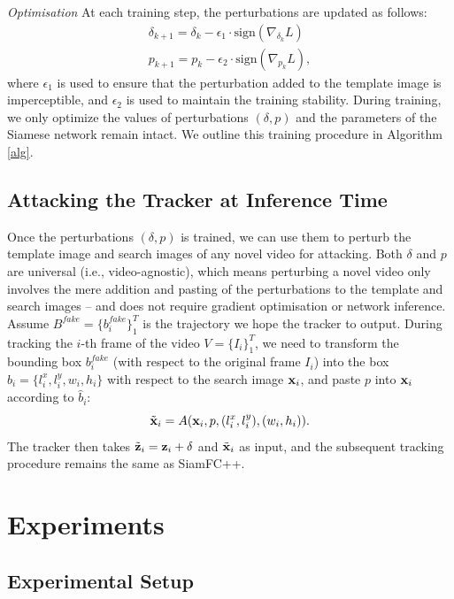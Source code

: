 \documentclass[journal]{IEEEtran}
\begin{document}
\textit{Optimisation} At each training step, the perturbations are updated as follows:
\begin{gather}
\delta_{k+1} = \delta_{k} - \epsilon_1 \cdot \text{sign}(\nabla_{\delta_k}L)\\
p_{k+1} = p_{k} - \epsilon_2 \cdot \text{sign}(\nabla_{p_k}L),
\end{gather}
where $\epsilon_1$ is used to ensure that the perturbation added to the template image is imperceptible, and $\epsilon_2$ is used to maintain the training stability.
During training, we only optimize the values of perturbations $(\delta, p)$ and the parameters of the Siamese network remain intact. We outline this training procedure in Algorithm \ref{alg}.

\subsection{Attacking the Tracker at Inference Time}

Once the perturbations $(\delta, p)$ is trained, we can use them to perturb the template image and search images of any novel video for attacking. Both $\delta$ and $p$ are universal (i.e., video-agnostic), which means perturbing a novel video only involves the mere addition and pasting of the perturbations to the template and search images -- and does not require gradient optimisation or network inference.
Assume $B^{fake}=\{b^{fake}_i\}_1^{T}$ is the trajectory we hope the tracker to output.
During tracking the $i$-th frame of the video $V=\{I_i\}_1^T$, we need to transform the bounding box $b^{fake}_i$ (with respect to the original frame $I_i$) into the box $\hat b_i=\{l^x_i, l^y_i, w_i, h_i\}$ with respect to the search image $\textbf x_i$, and paste $p$ into $\textbf x_i$ according to $\hat b_i$:
\begin{equation}
\tilde{\textbf x}_i = A(\textbf x_i, p, (l^x_i, l^y_i), (w_i, h_i)).
\end{equation}
The tracker then takes $\tilde{\textbf z}_i=\textbf z_i+\delta$ and $\tilde{ \textbf x}_i$ as input, and the subsequent tracking procedure remains the same as SiamFC++.

\section{Experiments}

\subsection{Experimental Setup}
\end{document}
